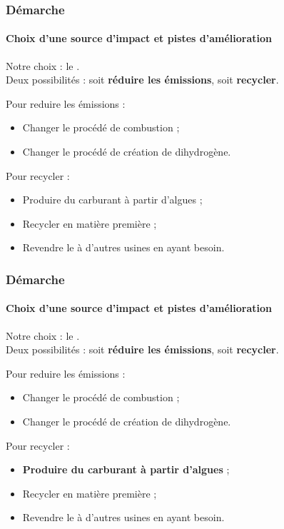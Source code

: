 \documentclass{beamer}
\begin{document}
	\begin{frame}
		\frametitle{Démarche}
		\framesubtitle{Choix d'une source d'impact et pistes d'amélioration} %
		Notre choix : le .\\
		Deux possibilités : soit \textbf{réduire les émissions}, soit \textbf{recycler}.
		
		Pour reduire les émissions :
		\begin{itemize}
			\item Changer le procédé de combustion ;
			\item Changer le procédé de création de dihydrogène.
		\end{itemize}
		Pour recycler :
		\begin{itemize}
			\item Produire du carburant à partir d'algues ;
			\item Recycler en matière première ;
			\item Revendre le  à d'autres usines
			en ayant besoin.
		\end{itemize}
	\end{frame}
	
		\begin{frame}
		\frametitle{Démarche}
		\framesubtitle{Choix d'une source d'impact et pistes d'amélioration} %
		Notre choix : le \chemform{CO_2}.\\
		Deux possibilités : soit \textbf{réduire les émissions}, soit \textbf{recycler}.
		
		Pour reduire les émissions :
		\begin{itemize}
			\item Changer le procédé de combustion ;
			\item Changer le procédé de création de dihydrogène.
		\end{itemize}
		Pour recycler :
		\begin{itemize}
			\item \textbf{Produire du carburant à partir d'algues} ;
			\item Recycler en matière première ;
			\item Revendre le  à d'autres usines
			en ayant besoin.
		\end{itemize}
	\end{frame}
	
\end{document}
